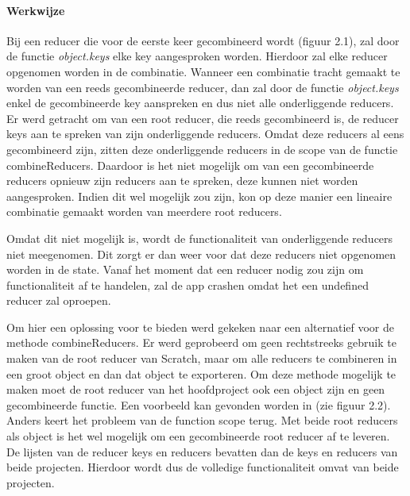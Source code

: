 \paragraph{Werkwijze}

Bij een reducer die voor de eerste keer gecombineerd wordt (figuur 2.1), zal door de functie \textit{object.keys} elke key aangesproken worden. Hierdoor zal elke reducer opgenomen worden in de combinatie. Wanneer een combinatie tracht gemaakt te worden van een reeds gecombineerde reducer, dan zal door de functie \textit{object.keys} enkel de gecombineerde key aanspreken en dus niet alle onderliggende reducers. Er werd getracht om van een root reducer, die reeds gecombineerd is, de reducer keys aan te spreken van zijn onderliggende reducers. Omdat deze reducers al eens gecombineerd zijn, zitten deze onderliggende reducers in de scope van de functie combineReducers. Daardoor is het niet mogelijk om van een gecombineerde reducers opnieuw zijn reducers aan te spreken, deze kunnen niet worden aangesproken. Indien dit wel mogelijk zou zijn, kon op deze manier een lineaire combinatie gemaakt worden van meerdere root reducers. 

Omdat dit niet mogelijk is, wordt de functionaliteit van onderliggende reducers niet meegenomen. Dit zorgt er dan weer voor dat deze reducers niet opgenomen worden in de state. Vanaf het moment dat een reducer nodig zou zijn om functionaliteit af te handelen, zal de app crashen omdat het een undefined reducer zal oproepen. 

Om hier een oplossing voor te bieden werd gekeken naar een alternatief voor de methode combineReducers. 
Er werd geprobeerd om geen rechtstreeks gebruik te maken van de root reducer van Scratch, maar om alle reducers te combineren in een groot object en dan dat object te exporteren. Om deze methode mogelijk te maken moet de root reducer van het hoofdproject ook een object zijn en geen gecombineerde functie. Een voorbeeld kan gevonden worden in (zie figuur 2.2). Anders keert het probleem van de function scope terug. Met beide root reducers als object is het wel mogelijk om een gecombineerde root reducer af te leveren. De lijsten van de reducer keys en reducers bevatten dan de keys en reducers van beide projecten. Hierdoor wordt dus de volledige functionaliteit omvat van beide projecten.

